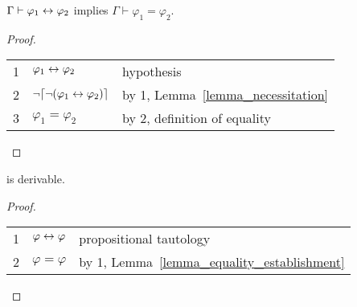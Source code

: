 \documentclass{amsart}
\begin{document}
\begin{lemma}
\label{lemma_equality_establishment}
$\Gamma \vdash \varphi_1 \leftrightarrow \varphi_2$ implies
$\Gamma \vdash \varphi_1 = \varphi_2$.
\end{lemma}
\begin{proof}\quad
\begin{center}
\begin{tabular}{l|ll}
		1 & $\varphi_1 \leftrightarrow \varphi_2$ & hypothesis \\
		2 & $\neg \lceil\neg (\varphi_1 \leftrightarrow \varphi_2)\rceil$ 
		  & by 1, Lemma~\ref{lemma_necessitation} \\
		3 & $\varphi_1 = \varphi_2$ 
		  & by 2, definition of equality
\end{tabular}
\end{center}
\end{proof}

\begin{lemma}
\label{lemma_equality_introduction}
 is derivable.
\end{lemma}
\begin{proof}\quad
	\begin{center}
		\begin{tabular}{l|ll}
			1 & $\varphi \leftrightarrow \varphi$ 
			  & propositional tautology \\
			2 & $\varphi = \varphi$ 
			  & by 1, Lemma~\ref{lemma_equality_establishment}
		\end{tabular}
	\end{center}
\end{proof}

\begin{comment}
\begin{lemma}
\label{lemma_equality_implies_dimp}
$(\varphi_1 = \varphi_2) \imp (\varphi_1 \dimp \varphi_2)$ is derivable.
\end{lemma}
\begin{proof}
By definition of equality and FOL reasoning,
it suffices to derive
$\neg (\varphi_1 \dimp \varphi_2) 
\imp \ceil {\neg (\varphi_1 \dimp \varphi_2)}$.
The latter is derivable by Lemma~\ref{lemma_P_implies_ceil_P}.
\end{proof}
\end{comment}
\end{document}
